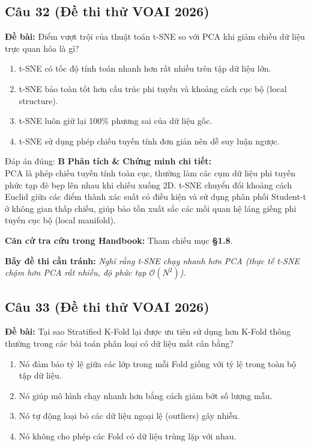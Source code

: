 \documentclass[10pt,a4paper]{article}
\begin{document}
\subsection*{Câu 32 (Đề thi thử VOAI 2026)}
\textbf{Đề bài:} Điểm vượt trội của thuật toán t-SNE so với PCA khi giảm chiều dữ liệu trực quan hóa là gì?

\begin{enumerate}[label=\textbf{\Alph*.}]
    \item t-SNE có tốc độ tính toán nhanh hơn rất nhiều trên tập dữ liệu lớn.
    \item t-SNE bảo toàn tốt hơn cấu trúc phi tuyến và khoảng cách cục bộ (local structure).
    \item t-SNE luôn giữ lại 100\% phương sai của dữ liệu gốc.
    \item t-SNE sử dụng phép chiếu tuyến tính đơn giản nên dễ suy luận ngược.
\end{enumerate}

\begin{solbox}{Đáp án đúng: \textbf{B}}
\textbf{Phân tích \& Chứng minh chi tiết:} \\
PCA là phép chiếu tuyến tính toàn cục, thường làm các cụm dữ liệu phi tuyến phức tạp đè bẹp lên nhau khi chiếu xuống 2D. t-SNE chuyển đổi khoảng cách Euclid giữa các điểm thành xác suất có điều kiện và sử dụng phân phối Student-t ở không gian thấp chiều, giúp bảo tồn xuất sắc các mối quan hệ láng giềng phi tuyến cục bộ (local manifold).

\vspace{0.4em}
\textbf{Căn cứ tra cứu trong Handbook:} Tham chiếu mục \textbf{§1.8}.

\vspace{0.4em}
\textbf{Bẫy đề thi cần tránh:} \textit{Nghĩ rằng t-SNE chạy nhanh hơn PCA (thực tế t-SNE chậm hơn PCA rất nhiều, độ phức tạp $\mathcal{O}(N^2)$).}
\end{solbox}
\vspace{0.5em}


\subsection*{Câu 33 (Đề thi thử VOAI 2026)}
\textbf{Đề bài:} Tại sao Stratified K-Fold lại được ưu tiên sử dụng hơn K-Fold thông thường trong các bài toán phân loại có dữ liệu mất cân bằng?

\begin{enumerate}[label=\textbf{\Alph*.}]
    \item Nó đảm bảo tỷ lệ giữa các lớp trong mỗi Fold giống với tỷ lệ trong toàn bộ tập dữ liệu.
    \item Nó giúp mô hình chạy nhanh hơn bằng cách giảm bớt số lượng mẫu.
    \item Nó tự động loại bỏ các dữ liệu ngoại lệ (outliers) gây nhiễu.
    \item Nó không cho phép các Fold có dữ liệu trùng lặp với nhau.
\end{enumerate}
\end{document}
